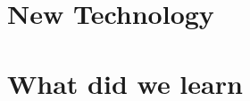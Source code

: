 \documentclass[10pt,draftclsnofoot,onecolumn]{IEEEtran}
\begin{document}
\section{New Technology} %

\section{What did we learn} %
\end{document}
